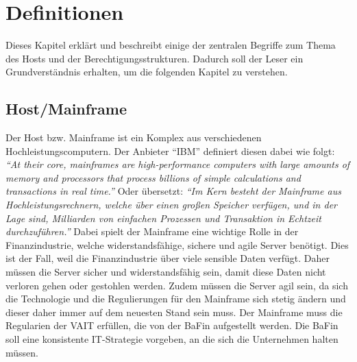 \chapter{Definitionen}
\label{ch:chapter02}
Dieses Kapitel erklärt und beschreibt einige der zentralen Begriffe zum Thema des Hosts und der Berechtigungsstrukturen.
Dadurch soll der Leser ein Grundverständnis erhalten, um die folgenden Kapitel zu verstehen.

%
%

\section{Host/Mainframe}
\label{sec:Host}
Der Host bzw. Mainframe ist ein Komplex aus verschiedenen Hochleistungscomputern.
Der Anbieter "`IBM"' definiert diesen dabei wie folgt: 
\newline
\newline
\textit{"`At their core, mainframes are high-performance computers with large amounts of memory and processors that process billions of simple calculations and transactions in real time."'} \cite{Mainframe}
\newline
\newline
Oder übersetzt:
\newline
\newline
\textit{"`Im Kern besteht der Mainframe aus Hochleistungsrechnern, welche über einen großen Speicher verfügen, und in der Lage sind, Milliarden von einfachen Prozessen und Transaktion in Echtzeit durchzuführen."'} \cite{Mainframe}
\newline
\newline
Dabei spielt der Mainframe eine wichtige Rolle in der Finanzindustrie, welche widerstandsfähige, sichere und agile Server benötigt.
Dies ist der Fall, weil die Finanzindustrie über viele sensible Daten verfügt.
Daher müssen die Server sicher und widerstandsfähig sein, damit diese Daten nicht verloren gehen oder gestohlen werden.
Zudem müssen die Server agil sein, da sich die Technologie und die Regulierungen für den Mainframe sich stetig ändern und dieser daher immer auf dem neuesten Stand sein muss.
Der Mainframe muss die Regularien der \ac{VAIT} erfüllen, die von der \ac{BaFin} aufgestellt werden.
Die \ac{BaFin} soll eine konsistente IT-Strategie vorgeben, an die sich die Unternehmen halten müssen. \cite{Vait}

